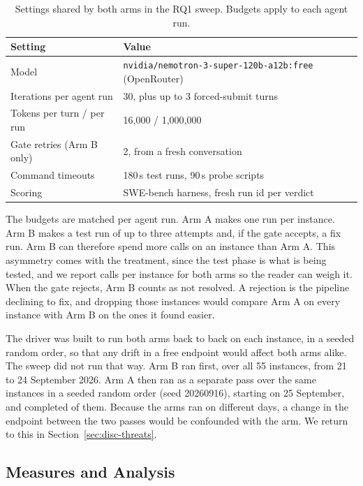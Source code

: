 \begin{table}[t]
  \caption{Settings shared by both arms in the RQ1 sweep. Budgets apply to
  each agent run.}
  \label{tab:exp-config}
  \small
  \begin{tabular}{@{}ll@{}}
    \toprule
    Setting & Value \\
    \midrule
    Model & \texttt{nvidia/nemotron-3-super-120b-a12b:free} (OpenRouter) \\
    Iterations per agent run & 30, plus up to 3 forced-submit turns \\
    Tokens per turn / per run & 16,000 / 1,000,000 \\
    Gate retries (Arm B only) & 2, from a fresh conversation \\
    Command timeouts & 180\,s test runs, 90\,s probe scripts \\
    Scoring & SWE-bench harness, fresh run id per verdict \\
    \bottomrule
  \end{tabular}
\end{table}

The budgets are matched per agent run. Arm A makes one run per instance.
Arm B makes a test run of up to three attempts and, if the gate accepts, a
fix run. Arm B can therefore spend more calls on an instance than Arm A. This
asymmetry comes with the treatment, since the test phase is what is being
tested, and we report calls per instance for both arms so the reader can weigh
it. When the gate rejects, Arm B counts as not resolved. A rejection is the
pipeline declining to fix, and dropping those instances would compare Arm A on
every instance with Arm B on the ones it found easier.

The driver was built to run both arms back to back on each instance, in a
seeded random order, so that any drift in a free endpoint would affect both
arms alike. The sweep did not run that way. Arm B ran first, over all 55
instances, from 21 to 24 September 2026. Arm A then ran as a separate pass over
the same instances in a seeded random order (seed 20260916), starting on 25
September, and completed  of them.
Because the arms ran on different days, a change in the endpoint between the
two passes would be confounded with the arm. We return to this in
Section~\ref{sec:disc-threats}.

\subsection{Measures and Analysis}
\label{sec:exp-metrics}

